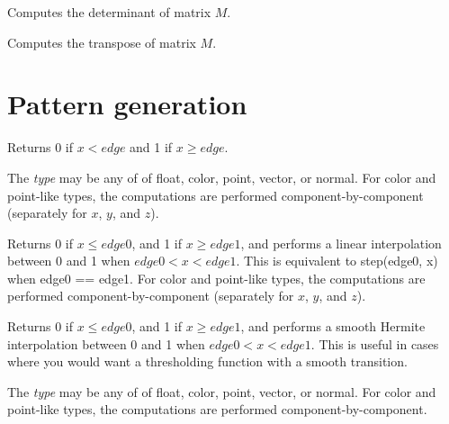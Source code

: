 \documentclass[11pt,letterpaper]{book}
\def\color{{\cf color}\xspace}
\def\float{{\cf float}\xspace}
\def\normal{{\cf normal}\xspace}
\def\point{{\cf point}\xspace}
\def\vector{{\cf vector}\xspace}
\begin{document}
Computes the determinant of matrix $M$.
\apiend

Computes the transpose of matrix $M$.
\apiend



\section{Pattern generation}
\label{sec:stdlib:pattern}

Returns 0 if $x < {\mathit edge}$ and 1 if $x \ge {\mathit edge}$.

The \emph{type} may be any of of \float, \color, \point, \vector, or
\normal.  For \color and \point-like types, the computations are
performed component-by-component (separately for $x$, $y$, and $z$).
\apiend

Returns 0 if $x \le {\mathit edge0}$, and 1 if $x \ge {\mathit edge1}$,
and performs a linear
interpolation between 0 and 1 when ${\mathit edge0} < x < {\mathit edge1}$.
This is equivalent to {\cf step(edge0, x)} when {\cf edge0 == edge1}.
For \color and \point-like types, the computations are
performed component-by-component (separately for $x$, $y$, and $z$).
\apiend

Returns 0 if $x \le {\mathit edge0}$, and 1 if $x \ge {\mathit edge1}$,
and performs a smooth Hermite
interpolation between 0 and 1 when ${\mathit edge0} < x < {\mathit edge1}$.
This is useful in cases where you would want a thresholding function
with a smooth transition.

The \emph{type} may be any of of \float, \color, \point, \vector, or
\normal.  For \color and \point-like types, the computations are
performed component-by-component.
\apiend
\end{document}
